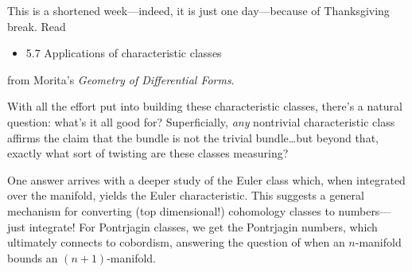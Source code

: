 \documentclass{homework}
\author{Jim Fowler}
\date{Week 14: Applications}
\begin{document}
\maketitle

This is a shortened week---indeed, it is just one day---because of
Thanksgiving break.  Read
\begin{itemize}
\item 5.7 Applications of characteristic classes
\end{itemize}
from Morita's \textit{Geometry of Differential Forms}.

With all the effort put into building these characteristic classes,
there's a natural question: what's it all good for?  Superficially,
\textit{any} nontrivial characteristic class affirms the claim that
the bundle is not the trivial bundle\ldots but beyond that, exactly
what sort of twisting are these classes measuring?

One answer arrives with a deeper study of the Euler class which, when
integrated over the manifold, yields the Euler characteristic.  This
suggests a general mechanism for converting (top dimensional!)
cohomology classes to numbers---just integrate!  For Pontrjagin
classes, we get the Pontrjagin numbers, which ultimately connects to
cobordism, answering the question of when an $n$-manifold bounds an
$(n+1)$-manifold.
\end{document}
